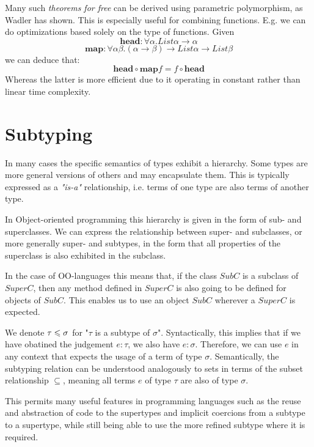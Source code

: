 Many such \emph{theorems for free} can be derived using parametric polymorphism, as Wadler has shown. \cite{wadlertheorems}
This is especially useful for combining functions.
E.g. we can do optimizations based solely on the type of functions.
Given
$$\mathbf{head}  : \forall \alpha. \mathit{List } \alpha \to \alpha$$
$$\mathbf{map} : \forall \alpha \beta. (\alpha \to \beta) \to \mathit{List } \alpha \to \mathit{List } \beta$$
we can deduce that: $$\mathbf{head} \circ \mathbf{map} f = f \circ \mathbf{head}$$
Whereas the latter is more efficient due to it operating in constant rather than linear time complexity.

\section{Subtyping}\label{sec:subtyping}

In many cases the specific semantics of types exhibit a hierarchy.
Some types are more general versions of others and may encapsulate them.
This is typically expressed as a \emph{"is-a"} relationship, i.e. terms of one type are also terms of another type.

In Object-oriented programming this hierarchy is given in the form of sub- and superclasses.
We can express the relationship between super- and subclasses, or more generally super- and subtypes,
in the form that all properties of the superclass is also exhibited in the subclass. \cite{subtyping}

In the case of OO-languages this means that, if the class $\mathit{SubC}$ is a subclass of $\mathit{SuperC}$,
then any method defined in $\mathit{SuperC}$ is also going to be defined for objects of $\mathit{SubC}$.
This enables us to use an object $\mathit{SubC}$ wherever a $\mathit{SuperC}$ is expected.

We denote $\tau \leqslant \sigma$ for "$\tau$ is a subtype of $\sigma$".
Syntactically, this implies that if we have obatined the judgement $e : \tau$, we also have $e : \sigma$.
Therefore, we can use $e$ in any context that expects the usage of a term of type $\sigma$.
Semantically, the subtyping relation can be understood analogously to sets in terms of the subset relationship $\subseteq$,
meaning all terms $e$ of type $\tau$ are also of type $\sigma$.
\cite{reynolds_1998}

This permits many useful features in programming languages such as the reuse and abstraction of code to the supertypes and implicit coercions from a subtype to a supertype, while still being able to use the more refined subtype where it is required.


